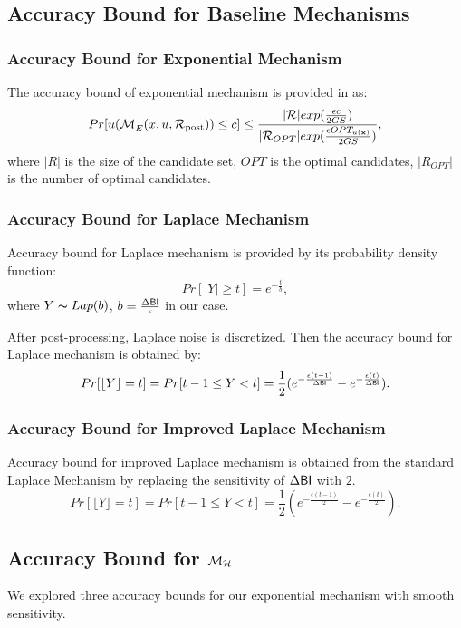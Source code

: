 \documentclass{article}
\begin{document}
\subsection{Accuracy Bound for Baseline Mechanisms}

\subsubsection{Accuracy Bound for Exponential Mechanism}
\label{subsec_accuracy_global}
The accuracy bound of exponential mechanism is provided in \cite{dwork2014algorithmic} as:
\begin{equation*}
Pr[u(\mathcal{M}_E^{}({x},{u},{\mathcal{R}_{\textup{post}}})) \leq c] 
		 \leq \frac{|\mathcal{R}|exp(\frac{\epsilon c}{2 GS})}{|\mathcal{R}_{OPT}| exp(\frac{\epsilon OPT_{u(\textbf{x})}}{2 GS})},
\end{equation*}
where $|R|$ is the size of the candidate set, $OPT$ is the optimal candidates, $|R_{OPT}|$ is the number of optimal candidates.


\subsubsection{Accuracy Bound for Laplace Mechanism}
\label{subsec_accuracy_lap}
Accuracy bound for Laplace mechanism is provided by its probability density function:
\begin{equation*}
Pr[|Y| \geq t] = e^{- \frac{t}{b}},
\end{equation*}
where $Y \thicksim Lap(b)$, $b = \frac{\Delta \mathsf{BI}}{\epsilon}$ in our case.

After post-processing, Laplace noise is discretized. Then the accuracy bound for Laplace mechanism is obtained by:
\[
Pr[\lfloor Y \rfloor = t] = Pr[ t-1 \leq Y < t] = \frac{1}{2} (e^{- \frac{\epsilon (t - 1)}{\Delta \mathsf{BI}}} - e^{- \frac{\epsilon (t)}{\Delta \mathsf{BI}}}).
\]

\subsubsection{Accuracy Bound for Improved Laplace Mechanism}
\label{subsec_accuracy_lap}
Accuracy bound for improved Laplace mechanism is obtained from the standard Laplace Mechanism by replacing the sensitivity of $\Delta \mathsf{BI}$ with $2$.
\[
Pr[\lfloor Y \rfloor = t] = Pr[ t-1 \leq Y < t] = \frac{1}{2} (e^{- \frac{\epsilon (t - 1)}{2}} - e^{- \frac{\epsilon (t)}{2}}).
\]


\subsection{Accuracy Bound for $\mathcal{M}_{\mathcal{H}}$}
\label{subsec_accuracy_smoo}
We explored three accuracy bounds for our exponential mechanism with smooth sensitivity.
\end{document}
